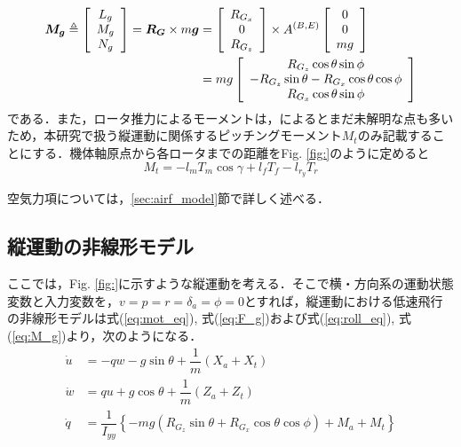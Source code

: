 \begin{equation}
  \begin{split}
    \mbox{\boldmath $M_g$} \triangleq
    \left[
    \begin{array}{ccc}
      L_g \\
      M_g \\
      N_g
    \end{array}
    \right] =
    \mbox{\boldmath $R_G$} \times
    m\mbox{\boldmath $g$} &=
    \left[
    \begin{array}{ccc}
      R_{G_x} \\
      0 \\
      R_{G_z}
    \end{array}
    \right] \times
    A^{(B,E)}
    \left[
    \begin{array}{ccc}
      0 \\
      0 \\
      mg
    \end{array}
    \right] \\
    &= mg
    \left[
    \begin{array}{ccc}
      R_{G_z}\cos\theta\sin\phi \\
      -R_{G_z}\sin\theta - R_{G_x}\cos\theta\cos\phi \\
      R_{G_x}\cos\theta\sin\phi
    \end{array}
    \right]
  \end{split}
  \label{eq:M_g}
\end{equation}
である．また，ロータ推力によるモーメントは，\cite{}によるとまだ未解明な点も多いため，本研究で扱う縦運動に関係するピッチングモーメント$M_t$のみ記載することにする．機体軸原点から各ロータまでの距離をFig. \ref{fig:}のように定めると
\begin{equation}
  M_t = -l_m T_m \cos\gamma + l_f T_f - l_{r_y} T_r
  \label{eq:M_t}
\end{equation}

空気力項については，\ref{sec:airf_model}節で詳しく述べる．

\subsection{縦運動の非線形モデル}
\label{sec:lng_non_linear}

ここでは，Fig. \ref{fig:}に示すような縦運動を考える．そこで横・方向系の運動状態変数と入力変数を，$v=p=r=\delta_a=\phi=0$とすれば，縦運動における低速飛行の非線形モデルは式(\ref{eq:mot_eq}), 式(\ref{eq:F_g})および式(\ref{eq:roll_eq}), 式(\ref{eq:M_g})より，次のようになる．
\begin{align}
  \dot{u} &= -qw - g\sin\theta +\dfrac{1}{m}(X_a + X_t) \\
  \dot{w} &= qu + g\cos\theta +\dfrac{1}{m}(Z_a + Z_t) \\
  \dot{q} &= \dfrac{1}{I_{yy}}\left\{-mg(R_{G_z}\sin\theta+R_{G_x}\cos\theta\cos\phi) + M_a + M_t\right\}
\end{align}

